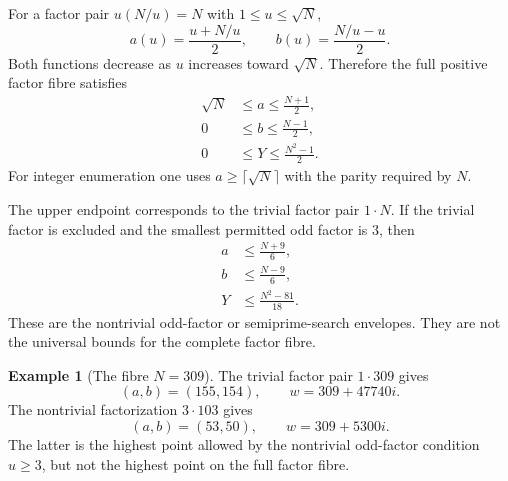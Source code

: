 \documentclass[11pt]{article}
\theoremstyle{definition}
\newtheorem{example}[theorem]{Example}
\newcommand{\1}{\mathbf{1}}
\begin{document}
For a factor pair $u(N/u)=N$ with $1\le u\le\sqrt N$,
\begin{equation}
 a(u)=\frac{u+N/u}{2},
 \qquad
 b(u)=\frac{N/u-u}{2}.
 \label{eq:ab-u}
\end{equation}
Both functions decrease as $u$ increases toward $\sqrt N$.  Therefore the full positive factor fibre satisfies
\begin{align}
 \sqrt N&\le a\le\frac{N+1}{2},
 \label{eq:a-full-range}\\
 0&\le b\le\frac{N-1}{2},
 \label{eq:b-full-range}\\
 0&\le Y\le\frac{N^2-1}{2}.
 \label{eq:Y-full-range}
\end{align}
For integer enumeration one uses $a\ge\lceil\sqrt N\rceil$ with the parity required by $N$.

The upper endpoint corresponds to the trivial factor pair $1\cdot N$.  If the trivial factor is excluded and the smallest permitted odd factor is $3$, then
\begin{align}
 a&\le\frac{N+9}{6},
 \label{eq:a-three}\\
 b&\le\frac{N-9}{6},
 \label{eq:b-three}\\
 Y&\le\frac{N^2-81}{18}.
 \label{eq:Y-three}
\end{align}
These are the nontrivial odd-factor or semiprime-search envelopes.  They are not the universal bounds for the complete factor fibre.

\begin{example}[The fibre $N=309$]
The trivial factor pair $1\cdot309$ gives
\[
 (a,b)=(155,154),
 \qquad
 w=309+47740i.
\]
The nontrivial factorization $3\cdot103$ gives
\[
 (a,b)=(53,50),
 \qquad
 w=309+5300i.
\]
The latter is the highest point allowed by the nontrivial odd-factor condition $u\ge3$, but not the highest point on the full factor fibre.
\end{example}
\end{document}
